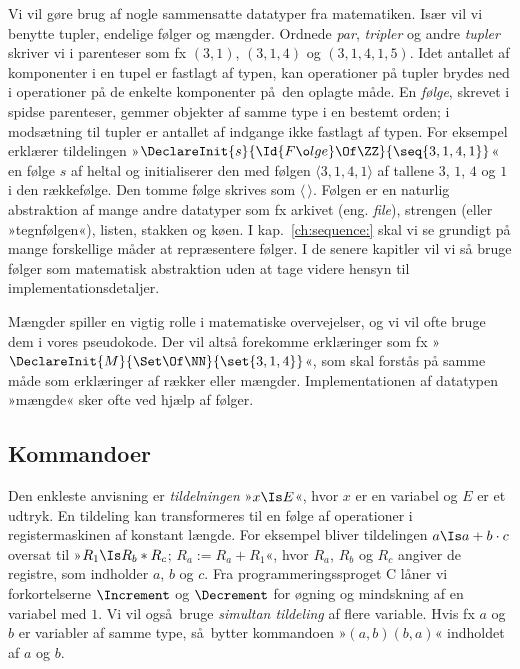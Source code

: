 Vi vil gøre brug af nogle sammensatte datatyper fra matematiken.
Især vil vi benytte tupler,
endelige følger
og mængder.
Ordnede \emph{par},
\emph{tripler}
og andre \emph{tupler} skriver vi i parenteser som fx $(3,1)$, $(3,1,4)$ og $(3,1,4,1,5)$.
Idet antallet af komponenter i en tupel er fastlagt af typen, kan operationer på tupler brydes ned i operationer på de enkelte komponenter på den oplagte måde.
En \emph{følge},
skrevet i spidse parenteser, gemmer objekter af samme type i en bestemt orden; i modsætning til tupler er antallet af indgange ikke fastlagt af typen.
For eksempel erklærer tildelingen »$\DeclareInit{s}{\Id{Følge} \Of \ZZ}{\seq{3,1,4,1}}$« en følge $s$ af heltal og initialiserer den med følgen $\langle 3,1,4,1\rangle$ af tallene $3$, $1$, $4$ og $1$ i den rækkefølge.
Den tomme følge skrives som $\langle\,\rangle$.
Følgen er en naturlig abstraktion af mange andre datatyper som fx arkivet
(eng. \emph{file}), strengen
(eller »tegnfølgen«), listen,
stakken
og køen.
I kap.~\ref{ch:sequence:} skal vi se grundigt på mange forskellige måder at repræsentere følger.
I de senere kapitler vil vi så bruge følger som matematisk abstraktion uden at tage videre hensyn til implementationsdetaljer.

Mængder
spiller en vigtig rolle i matematiske overvejelser, og vi vil ofte bruge dem i vores pseudokode.
Der vil altså forekomme erklæringer som fx »$\DeclareInit{M}{\Set \Of \NN}{\set{3,1,4}}$«, som skal forstås på samme måde som erklæringer af rækker eller mængder.
Implementationen af datatypen »mængde« sker ofte ved hjælp af følger.

\subsection{Kommandoer}

Den enkleste anvisning er \emph{tildelningen}
»$x\Is E$«, hvor $x$ er en variabel og $E$ er et udtryk.
En tildeling kan transformeres til en følge af operationer i registermaskinen af konstant længde.
For eksempel bliver tildelingen $a\Is a+b\cdot c$ oversat til »$R_1\Is R_b*R_c$; $R_a:= R_a+R_1$«, hvor $R_a$, $R_b$ og $R_c$ angiver de registre, som indholder $a$, $b$ og $c$.
Fra programmeringssproget C låner vi forkortelserne $\Increment$
og $\Decrement$
for øgning og mindskning af en variabel med $1$.
Vi vil også bruge \emph{simultan tildeling} af flere variable.
Hvis fx $a$ og $b$ er variabler af samme type, så bytter
kommandoen »$(a,b)$\Is $(b,a)$« indholdet af $a$ og $b$.

